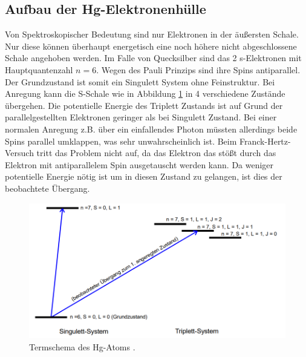 \subsection{Aufbau der Hg-Elektronenhülle}
Von Spektroskopischer Bedeutung sind nur Elektronen in der äußersten Schale. Nur diese 
können überhaupt energetisch eine noch höhere nicht abgeschlossene Schale angehoben werden.
Im Falle von Quecksilber sind das 2 s-Elektronen mit Hauptquantenzahl $n=6$. Wegen des Pauli
Prinzips sind ihre Spins antiparallel. Der Grundzustand ist somit ein Singulett System ohne
Feinstruktur. Bei Anregung kann die S-Schale wie in Abbildung \ref{fig:Term} in 4 verschiedene Zustände
übergehen. Die potentielle Energie des Triplett Zustands ist auf Grund der 
parallelgestellten Elektronen geringer als bei Singulett Zustand. Bei einer normalen Anregung 
z.B. über ein einfallendes Photon müssten allerdings beide Spins parallel umklappen, was sehr unwahrscheinlich ist.
Beim Franck-Hertz-Versuch tritt das Problem nicht auf, da das Elektron das stößt durch das Elektron mit antiparallelem 
Spin ausgetauscht werden kann. Da weniger potentielle Energie nötig ist um in diesen Zustand zu gelangen, ist dies der beobachtete Übergang.
\begin{figure}[H]
    \centering
    \includegraphics[scale=0.8]{content/Termschema.png}
    \caption{Termschema des Hg-Atoms \cite{sample}.}
    \label{fig:Term}
\end{figure}

\cite{sample}
